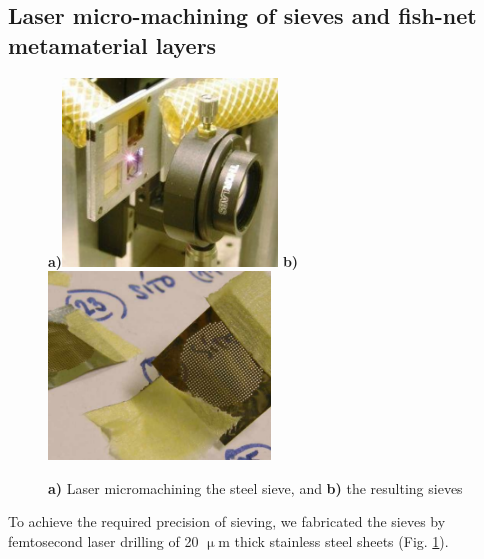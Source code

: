 \subsection{Laser micro-machining of sieves and fish-net metamaterial layers}%
\begin{figure}[ht] \caption{\textbf{a)} Laser micromachining the steel sieve, and \textbf{b)} the resulting sieves} \label{fg_microfab} \centering 
\textbf{a)}\includegraphics[height=5cm]{img/technology/sieve2_drilling_m.pdf}
\textbf{b)}\includegraphics[height=5cm]{img/technology/steel_sieve_on_paper.pdf}
\end{figure}

To achieve the required precision of sieving, we fabricated the sieves by femtosecond laser drilling of 20 $\upmu$m thick stainless steel sheets (Fig. \ref{fg_microfab}). 

